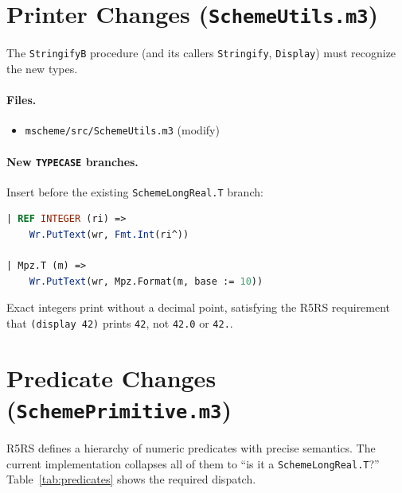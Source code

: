 \documentclass[12pt]{article}
\begin{document}
\section{Printer Changes ({\tt SchemeUtils.m3})}
\label{sec:impl-printer}

The {\tt StringifyB} procedure (and its callers {\tt Stringify},
{\tt Display}) must recognize the new types.

\paragraph{Files.}
\begin{itemize}[nosep]
\item {\tt mscheme/src/SchemeUtils.m3} (modify)
\end{itemize}

\paragraph{New {\tt TYPECASE} branches.}
Insert before the existing {\tt SchemeLongReal.T} branch:

\begin{lstlisting}[language=Modula3]
| REF INTEGER (ri) =>
    Wr.PutText(wr, Fmt.Int(ri^))

| Mpz.T (m) =>
    Wr.PutText(wr, Mpz.Format(m, base := 10))
\end{lstlisting}

\noindent Exact integers print without a decimal point, satisfying
the R5RS requirement that {\tt (display 42)} prints {\tt 42}, not
{\tt 42.0} or {\tt 42.}.

\section{Predicate Changes ({\tt SchemePrimitive.m3})}
\label{sec:impl-predicates}

R5RS defines a hierarchy of numeric predicates with precise
semantics.  The current implementation collapses all of them to
``is it a {\tt SchemeLongReal.T}?''  Table~\ref{tab:predicates}
shows the required dispatch.
\end{document}
